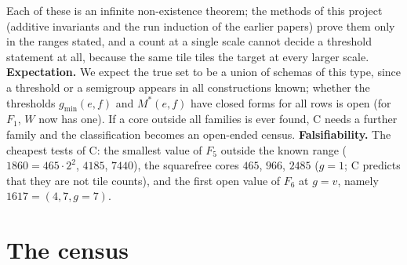 \documentclass[11pt,reqno]{amsart}
\theoremstyle{plain}
\theoremstyle{definition}
\begin{document}
Each of these is an infinite non-existence theorem; the methods of this project (additive invariants and the run induction of the earlier papers) prove them only in the ranges stated, and a count at a single scale cannot decide a threshold statement at all, because the same tile tiles the target at every larger scale.
\textbf{Expectation.} We expect the true set to be a union of schemas of this type, since a threshold or a semigroup appears in all constructions known; whether the thresholds $g_{\min}(e,f)$ and $M^*(e,f)$ have closed forms for all rows is open (for $F_1$, $W$ now has one).
If a core outside all families is ever found, C needs a further family and the classification becomes an open-ended census.
\textbf{Falsifiability.} The cheapest tests of C: the smallest value of $F_5$ outside the known range ($1860=465\cdot2^2$, $4185$, $7440$), the squarefree cores $465$, $966$, $2485$ ($g=1$; C predicts that they are not tile counts), and the first open value of $F_6$ at $g=v$, namely $1617=(4,7,g=7)$.

\section{The census}\label{sec:census}
\end{document}
